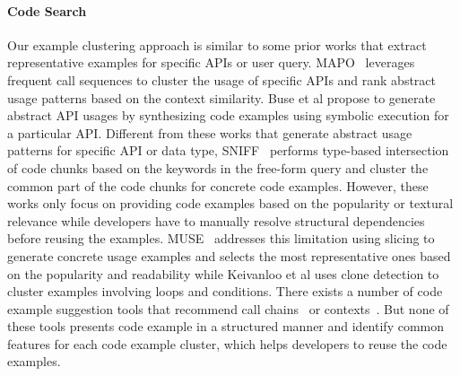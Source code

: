 \paragraph{Code Search} Our example clustering approach is similar to some prior works that extract representative examples for specific APIs or user query. 
MAPO~\cite{MAPO:ECOOP09} leverages frequent call sequences to cluster the usage of specific APIs and rank abstract usage patterns based on the context similarity. Buse et al\/\cite{Buse:apiICSE12} propose to generate abstract API usages by synthesizing code examples using symbolic execution for a particular API. Different from these works that generate abstract usage patterns for specific API or data type, SNIFF~\cite{sniff:Sen09} performs type-based intersection of code chunks based on the keywords in the free-form query and cluster the common part of the code chunks for concrete code examples. However, these works   only focus on providing code examples based on the popularity or textural relevance while developers have to manually resolve structural dependencies before reusing the examples.  MUSE~\cite{MUSE:MarcusICSE15} addresses this limitation using slicing to generate concrete usage examples and selects the most representative ones based on the popularity and readability while  Keivanloo et al\/\cite{spotWork:ICSE14} uses clone detection to cluster examples involving loops and conditions.  There exists a number of code example suggestion tools that recommend call chains~\cite{Mandelin:jungloid05, parseWeb:ASE07, Xsnippet:OOPSLA06}  or contexts~\cite{Holmes:structural05, Prompter:MSR14}. But none of  these tools presents code example in a structured manner and identify  common features for each code example cluster, which helps developers to reuse the code examples. 


